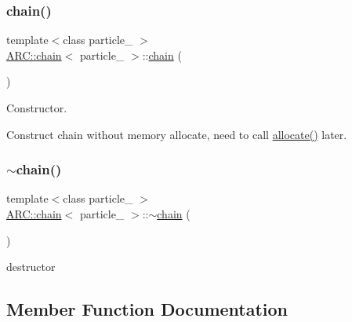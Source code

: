 \subsubsection{\texorpdfstring{chain()}{chain()}\hspace{0.1cm}{\footnotesize\ttfamily [2/2]}}
{\footnotesize\ttfamily template$<$class particle\+\_\+ $>$ \\
\hyperlink{classARC_1_1chain}{A\+R\+C\+::chain}$<$ particle\+\_\+ $>$\+::\hyperlink{classARC_1_1chain}{chain} (\begin{DoxyParamCaption}{ }\end{DoxyParamCaption})\hspace{0.3cm}{\ttfamily [inline]}}



Constructor. 

Construct chain without memory allocate, need to call \hyperlink{classARC_1_1chain_aee00fac50bb4a5a24ab1af5e563bdf98}{allocate()} later. \hypertarget{classARC_1_1chain_af83c26f178fd88947cdd53fa4b6cb047}{}\label{classARC_1_1chain_af83c26f178fd88947cdd53fa4b6cb047} 
\subsubsection{\texorpdfstring{$\sim$chain()}{~chain()}}
{\footnotesize\ttfamily template$<$class particle\+\_\+ $>$ \\
\hyperlink{classARC_1_1chain}{A\+R\+C\+::chain}$<$ particle\+\_\+ $>$\+::$\sim$\hyperlink{classARC_1_1chain}{chain} (\begin{DoxyParamCaption}{ }\end{DoxyParamCaption})\hspace{0.3cm}{\ttfamily [inline]}}



destructor 



\subsection{Member Function Documentation}
\hypertarget{classARC_1_1chain_a2df655cb46fcb7e892f196340e7d5c83}{}\label{classARC_1_1chain_a2df655cb46fcb7e892f196340e7d5c83} 
